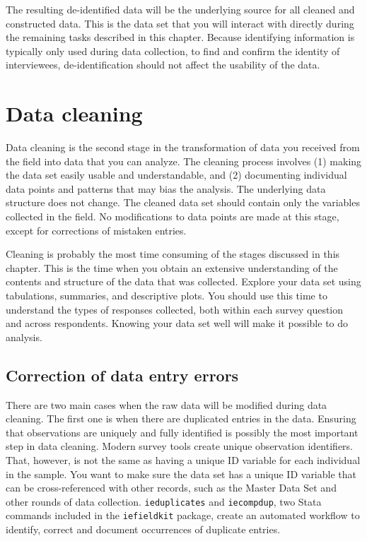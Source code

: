 The resulting de-identified data will be the underlying source for all cleaned and constructed data.
This is the data set that you will interact with directly during the remaining tasks described in this chapter.
Because identifying information is typically only used during data collection, 
to find and confirm the identity of interviewees, 
de-identification should not affect the usability of the data.


\section{Data cleaning}

Data cleaning is the second stage in the transformation of data you received from the field into data that you can analyze.
The cleaning process involves (1) making the data set easily usable and understandable, 
and (2) documenting individual data points and patterns that may bias the analysis.
The underlying data structure does not change.
The cleaned data set should contain only the variables collected in the field.
No modifications to data points are made at this stage, except for corrections of mistaken entries.

Cleaning is probably the most time consuming of the stages discussed in this chapter.
This is the time when you obtain an extensive understanding of  the contents and structure of the data that was collected.
Explore your data set using tabulations, summaries, and descriptive plots.
You should use this time to understand the types of responses collected, both within each survey question and across respondents.
Knowing your data set well will make it possible to do analysis.

\subsection{Correction of data entry errors}

There are two main cases when the raw data will be modified during data cleaning.
The first one is when there are duplicated entries in the data.
Ensuring that observations are uniquely and fully identified
is possibly the most important step in data cleaning.
Modern survey tools create unique observation identifiers.
That, however, is not the same as having a unique ID variable for each individual in the sample.
You want to make sure the data set has a unique ID variable
that can be cross-referenced with other records, such as the Master Data Set
and other rounds of data collection.
\texttt{ieduplicates} and \texttt{iecompdup}, 
two Stata commands included in the \texttt{iefieldkit} 
package,
create an automated workflow to identify, correct and document
occurrences of duplicate entries. 

